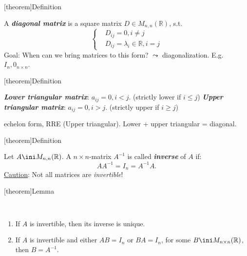 \documentclass[12pt]{report}
\theoremstyle{definition}
\begin{document}
[theorem]{Definition}
\begin{diagonal matrix}
    A \textbf{\emph{diagonal matrix}} is a square matrix $D \in M_{n,n}(\mathbb{R})$, s.t.\[
        \left\{
            \begin{align*}
                & D_{ij} = 0, i \neq j \\
                & D_{ij} = \lambda_i \in \mathbb{R}, i = j
            \end{align*}
        \right.
    \]
    Goal: When can we bring matrices to this form? $\leadsto$ diagonalization.
    E.g. $I_n, 0_{n\times n}$.
\end{diagonal matrix}

[theorem]{Definition}
\begin{upper and lower triangular matrix}
    \textbf{\emph{Lower triangular matrix}}: $a_{ij} = 0, i < j$. (strictly lower if $i \le j$)
    \textbf{\emph{Upper triangular matrix}}: $a_{ij} = 0, i > j$. (strictly upper if $i \ge j$)
\end{upper and lower triangular matrix}

\begin{ex}
    echelon form, RRE (Upper triangular).
    Lower + upper triangular = diagonal.
\end{ex}


[theorem]{Definition}
\begin{inverse square matrix}
    Let $A \ini M_{n,n}(\mathbb{R})$. A $n \times n$-matrix $A^{-1}$ is called \textbf{\emph{inverse}}
    of $A$ if:\[
        AA^{-1} = I_n = A^{-1}A.
    \]
    \underline{Caution}: Not all matrices are \emph{invertible}!
\end{inverse square matrix}

[theorem]{Lemma}
\begin{lemma Of inverse matrix}
    \,

    \begin{enumerate}[label = (\arabic*)]
        \item If $A$ is invertible, then its inverse is unique.
        \item If $A$ is invertible and either $AB = I_n$ or $BA = I_n$, for some $B \ini M_{n\times n}(\mathbb{R})$,
            then $B = A^{-1}$.
    \end{enumerate}
    
\end{lemma Of inverse matrix}
\end{document}
